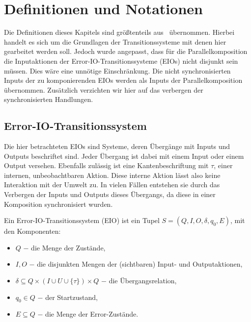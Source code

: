 \chapter{Definitionen und Notationen}

Die Definitionen dieses Kapitels sind größtenteils aus~\cite{Vogler2014EIO}
übernommen. Hierbei handelt es sich um die Grundlagen der Transitionssysteme mit denen
hier gearbeitet werden soll. Jedoch wurde angepasst, dass für die
Parallelkomposition die Inputaktionen der Error-IO-Transitionssysteme (EIOs) nicht disjunkt sein müssen. Dies
wäre eine unnötige Einschränkung. Die nicht synchronisierten Inputs der zu komponierenden EIOs werden
als Inputs der Parallelkomposition übernommen. Zusätzlich verzichten wir hier
auf das verbergen der synchronisierten Handlungen.

\section{Error-IO-Transitionssystem}
Die hier betrachteten EIOs sind Systeme, deren Übergänge mit Inputs und Outputs
beschriftet sind. Jeder Übergang ist dabei mit einem Input oder einem Output
versehen. Ebenfalls zulässig ist eine Kantenbeschriftung mit $\tau$, einer
internen, unbeobachtbaren Aktion. Diese interne
Aktion lässt also keine Interaktion mit
der Umwelt zu. In vielen Fällen entstehen sie durch das Verbergen der Inputs und Outputs
dieses Übergangs, da diese in einer Komposition synchronisiert
wurden.

\begin{Def}
  Ein Error-IO-Transitionssystem (EIO) ist
  ein Tupel $S=(Q,I,O,\delta, q_0, E)$, mit den Komponenten:
  \begin{itemize}
    \item $Q$ $-$ die Menge der Zustände,
    \item $I,O$ $-$ die disjunkten Mengen der (sichtbaren) Input- und
      Outputaktionen,
    \item $\delta\subseteq Q\times (I\cup U\cup\{\tau\})\times Q$ $-$ die
      Übergangsrelation,
    \item $q_0\in Q$ $-$ der Startzustand,
    \item $E\subseteq Q$ $-$ die Menge der Error-Zustände.
  \end{itemize}
\end{Def}

